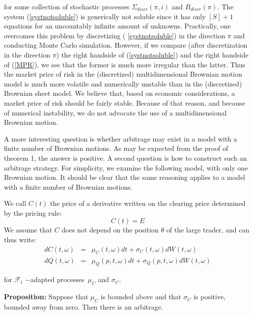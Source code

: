 \documentclass{article}
\begin{document}
for some collection of stochastic processes $\Sigma _{discr}(\pi ,i)$ and $%
B_{discr}(\pi )$. The system (\ref{systnotsoluble}) is generically not
soluble since it has only $[S]+1$ equations for an uncountably infinite
amount of unknowns. Practically, one overcomes this problem by discretizing (%
\ref{systnotsoluble}) in the direction $\pi $ and conducting Monte Carlo
simulation. However, if we compare (after discretization in the direction $%
\pi $) the right handside of (\ref{systnotsoluble}) and the right handside
of (\ref{MPR}), we see that the former is much more irregular than the
latter. Thus the market price of risk in the (discretized) multidimensional
Brownian motion model is much more volatile and numerically unstable than in
the (discretized) Brownian sheet model. We believe that, based on economic
considerations, a market price of risk should be fairly stable. Because of
that reason, and because of numerical instability, we do not advocate the
use of a multidimensional Brownian motion.

\bigskip

A more interesting question is whether arbitrage may exist in a model with a
finite number of Brownian motions. As may be expected from the proof of
theorem 1, the answer is positive. A second question is how to construct
such an arbitrage strategy. For simplicity, we examine the following model,
with only one Brownian motion. It should be clear that the same reasoning
applies to a model with a finite number of Brownian motions.

\bigskip

We call $C(t)$ the price of a derivative written on the clearing price
determined by the pricing rule:%
\begin{equation*}
C(t)=E
\end{equation*}
We assume that $C$ does not depend on the position $\theta $ of the large
trader, and can thus write:%
\begin{eqnarray*}
dC(t,\omega ) &=&\mu _{C}(t,\omega )dt+\sigma _{C}(t,\omega )dW(t,\omega ) \\
dQ(t,\omega ) &=&\mu _{Q}(p,t,\omega )dt+\sigma _{Q}(p,t,\omega )dW(t,\omega
)
\end{eqnarray*}%
\bigskip

for $\mathcal{F}_{t}$ $-$adapted processes\ $\mu _{C}$ and $\sigma _{C}$.

\bigskip

\textbf{Proposition:} Suppose that $\mu _{C}$ is bounded above and that $%
\sigma _{C}$ is positive, bounded away from zero. Then there is an arbitrage.
\end{document}
